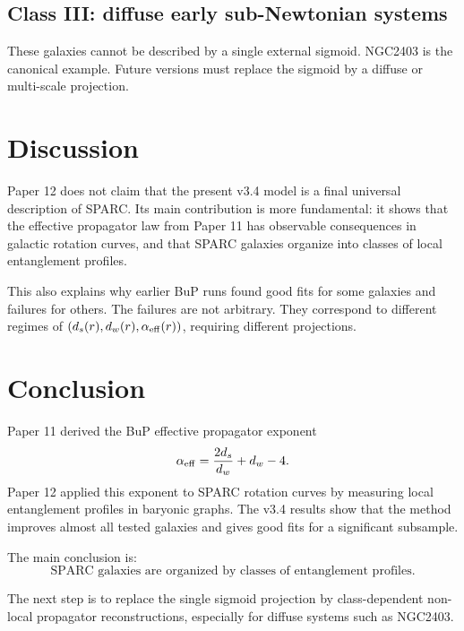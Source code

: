 \documentclass[11pt,a4paper]{article}
\begin{document}
\subsection{Class III: diffuse early sub-Newtonian systems}

These galaxies cannot be described by a single external sigmoid. NGC2403 is
the canonical example. Future versions must replace the sigmoid by a diffuse
or multi-scale projection.

\section{Discussion}

Paper 12 does not claim that the present v3.4 model is a final universal
description of SPARC. Its main contribution is more fundamental: it shows that
the effective propagator law from Paper 11 has observable consequences in
galactic rotation curves, and that SPARC galaxies organize into classes of
local entanglement profiles.

This also explains why earlier BuP runs found good fits for some galaxies and
failures for others. The failures are not arbitrary. They correspond to
different regimes of \((d_s(r),d_w(r),\alpha_{\rm eff}(r))\), requiring
different projections.

\section{Conclusion}

Paper 11 derived the BuP effective propagator exponent
\[
\alpha_{\rm eff}
=
\frac{2d_s}{d_w}+d_w-4.
\]
Paper 12 applied this exponent to SPARC rotation curves by measuring local
entanglement profiles in baryonic graphs. The v3.4 results show that the method
improves almost all tested galaxies and gives good fits for a significant
subsample.

The main conclusion is:
\[
\boxed{
\text{SPARC galaxies are organized by classes of entanglement profiles.}
}
\]

The next step is to replace the single sigmoid projection by class-dependent
non-local propagator reconstructions, especially for diffuse systems such as
NGC2403.
\end{document}

